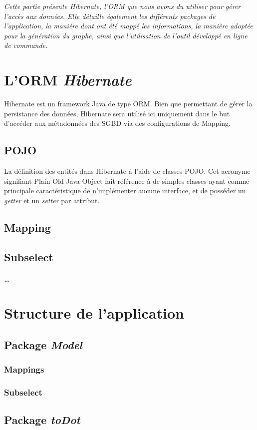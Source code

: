 \textit{Cette partie présente \emph{Hibernate}, l'ORM que nous avons du utiliser pour gérer l'accès aux données. Elle détaille également les différents packages de l'application, la manière dont ont été mappé les informations, la manière adoptée pour la génération du graphe, ainsi que l'utilisation de l'outil développé en ligne de commande.}

\section{L'ORM \emph{Hibernate}}
Hibernate est un framework Java de type ORM. Bien que permettant de gérer la persistance des données, Hibernate sera utilisé ici uniquement dans le but d'accéder aux métadonnées des SGBD via des configurations de Mapping.
\subsection{POJO}
La définition des entités dans Hibernate à l'aide de classes POJO. Cet acronyme signifiant \og Plain Old Java Object \fg{} fait référence à de simples classes ayant comme principale caractéristique de n'implémenter aucune interface, et de posséder un \emph{getter} et un \emph{setter} par attribut.
\subsection{Mapping}

\subsection{Subselect}
\subparagraph{\ldots}

\section{Structure de l'application}
\subsection{Package \emph{Model}}
\subsubsection{Mappings}
\subsubsection{Subselect}
\subsection{Package \emph{toDot}}
